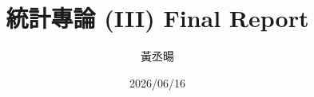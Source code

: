 \documentclass[aspectratio=169,12pt]{beamer}
\title{統計專論 (III) Final Report}
\author{黃丞暘}
\date{2026/06/16}
\begin{document}
\begin{frame}
    \titlepage
\end{frame}
\end{document}
